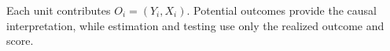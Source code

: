 Each unit contributes \(O_i=(Y_i,X_i)\). Potential outcomes provide the causal interpretation, while estimation and testing use only the realized outcome and score.